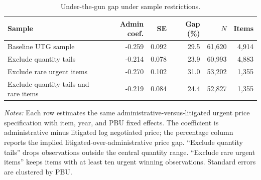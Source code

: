 \begin{table}[ht]
\centering
\caption{Under-the-gun gap under sample restrictions.}
\label{tab:sample_restriction_robustness}
\begin{threeparttable}
\small
\setlength{\tabcolsep}{3pt}
\begin{tabular}{p{.32\linewidth}rrrrr}
\toprule
Sample & Admin coef. & SE & Gap (\%) & $N$ & Items \\
\midrule
Baseline UTG sample & -0.259 & 0.092 & 29.5 & 61,620 & 4,914 \\
Exclude quantity tails & -0.214 & 0.078 & 23.9 & 60,993 & 4,883 \\
Exclude rare urgent items & -0.270 & 0.102 & 31.0 & 53,202 & 1,355 \\
Exclude quantity tails and rare items & -0.219 & 0.084 & 24.4 & 52,827 & 1,355 \\
\bottomrule
\end{tabular}
\begin{tablenotes}[flushleft]\footnotesize
\item \textit{Notes:} Each row estimates the same administrative-versus-litigated urgent price specification with item, year, and PBU fixed effects. The coefficient is administrative minus litigated log negotiated price; the percentage column reports the implied litigated-over-administrative price gap. ``Exclude quantity tails'' drops observations outside the central quantity range. ``Exclude rare urgent items'' keeps items with at least ten urgent winning observations. Standard errors are clustered by PBU.
\end{tablenotes}
\end{threeparttable}
\end{table}
